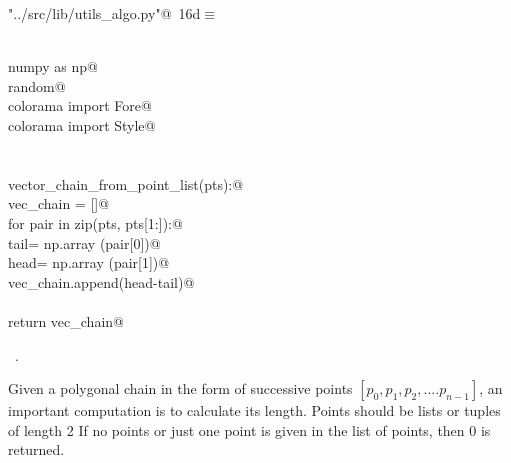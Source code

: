 \documentclass[11.5pt]{report}
\begin{document}
\begin{flushleft} \small\label{scrap11}\raggedright\small
{} \verb@"../src/lib/utils_algo.py"@\nobreak\ {\footnotesize {16d}}$\equiv$
\vspace{-1ex}
\begin{list}{}{} \item
\mbox{}\verb@@\\
\mbox{}\verb@import numpy as np@\\
\mbox{}\verb@import random@\\
\mbox{}\verb@from colorama import Fore@\\
\mbox{}\verb@from colorama import Style@\\
\mbox{}\verb@@\\
\mbox{}\verb@@\\
\mbox{}\verb@def vector_chain_from_point_list(pts):@\\
\mbox{}\verb@    vec_chain = []@\\
\mbox{}\verb@    for pair in zip(pts, pts[1:]):@\\
\mbox{}\verb@        tail= np.array (pair[0])@\\
\mbox{}\verb@        head= np.array (pair[1])@\\
\mbox{}\verb@        vec_chain.append(head-tail)@\\
\mbox{}\verb@@\\
\mbox{}\verb@    return vec_chain@\\
\mbox{}\verb@@{\NWsep}
\end{list}
\vspace{-1.5ex}
\footnotesize
\begin{list}{}{\setlength{\itemsep}{-\parsep}\setlength{\itemindent}{-\leftmargin}}
\item \NWtxtFileDefBy\ .

\item{}
\end{list}
\vspace{4ex}
\end{flushleft}

\newchunk Given a polygonal chain in the form of successive points  $[p_0,p_1,p_2,....p_{n-1}]$, 
an important computation is to calculate its length. Points should be lists or tuples of length 2
If no points or just one point is given in the list of points, then 0 is returned.
\end{document}
